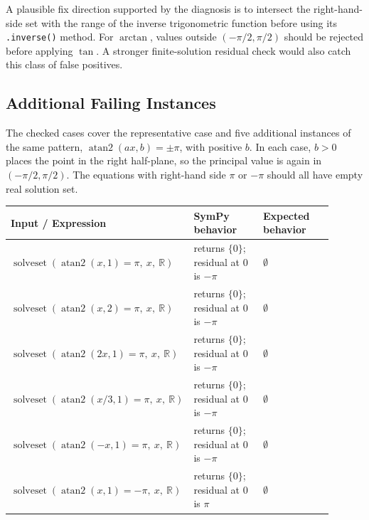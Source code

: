 \documentclass[11pt]{article}
\begin{document}
A plausible fix direction supported by the diagnosis is to intersect the
right-hand-side set with the range of the inverse trigonometric function before
using its \texttt{.inverse()} method. For \(\arctan\), values outside
\((-\pi/2,\pi/2)\) should be rejected before applying \(\tan\). A stronger
finite-solution residual check would also catch this class of false positives.

\subsection{Additional Failing Instances}

The checked cases cover the representative case and five additional instances
of the same pattern,
\(\operatorname{atan2}(a x,b)=\pm\pi\), with positive \(b\). In each case,
\(b>0\) places the point in the right half-plane, so the principal value is
again in \((-\pi/2,\pi/2)\). The equations with right-hand side \(\pi\) or
\(-\pi\) should all have empty real solution set.

\begin{center}
\small
\renewcommand{\arraystretch}{1.3}
\begin{tabular}{@{}>{\raggedright\arraybackslash}p{0.44\linewidth}>{\raggedright\arraybackslash}p{0.23\linewidth}>{\raggedright\arraybackslash}p{0.23\linewidth}@{}}
\toprule
\textbf{Input / Expression} & \textbf{SymPy behavior} & \textbf{Expected behavior} \\
\midrule
\(\operatorname{solveset}(\operatorname{atan2}(x,1)=\pi,\ x,\ \mathbb{R})\) & returns \(\{0\}\); residual at \(0\) is \(-\pi\) & \(\emptyset\) \\
\(\operatorname{solveset}(\operatorname{atan2}(x,2)=\pi,\ x,\ \mathbb{R})\) & returns \(\{0\}\); residual at \(0\) is \(-\pi\) & \(\emptyset\) \\
\(\operatorname{solveset}(\operatorname{atan2}(2x,1)=\pi,\ x,\ \mathbb{R})\) & returns \(\{0\}\); residual at \(0\) is \(-\pi\) & \(\emptyset\) \\
\(\operatorname{solveset}(\operatorname{atan2}(x/3,1)=\pi,\ x,\ \mathbb{R})\) & returns \(\{0\}\); residual at \(0\) is \(-\pi\) & \(\emptyset\) \\
\(\operatorname{solveset}(\operatorname{atan2}(-x,1)=\pi,\ x,\ \mathbb{R})\) & returns \(\{0\}\); residual at \(0\) is \(-\pi\) & \(\emptyset\) \\
\(\operatorname{solveset}(\operatorname{atan2}(x,1)=-\pi,\ x,\ \mathbb{R})\) & returns \(\{0\}\); residual at \(0\) is \(\pi\) & \(\emptyset\) \\
\bottomrule
\end{tabular}
\end{center}
\end{document}
